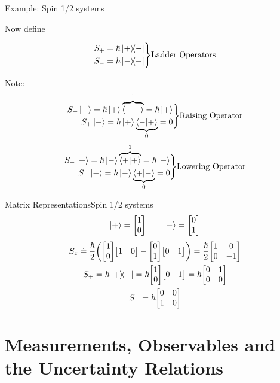\begin{frame}{Example: Spin 1/2 systems}

	Now define

	\[
		\begin{split}
			S_+ = \hbar \op{+}{-} \\
			S_- = \hbar \op{-}{+}
		\end{split}\Biggr\} \text{Ladder Operators}
	\]

	Note:
	\[
		\begin{split}
			S_+ \ket{-} = \hbar \ket + \overbrace{\ip{-}}^1 = \hbar\ket + \\
			S_+ \ket{+} = \hbar \ket + \underbrace{\ip{-}{+}}_0 =  0      \\
		\end{split} \Biggr\} \text{Raising Operator}
	\]
	\[
		\begin{split}
			S_- \ket{+} = \hbar \ket - \overbrace{\ip{+}}^1 = \hbar\ket - \\
			S_- \ket{-} = \hbar \ket - \underbrace{\ip{+}{-}}_0 =  0      \\
		\end{split} \Biggr\} \text{Lowering Operator}
	\]

\end{frame}


\begin{frame}{Matrix Representations}{Spin 1/2 systems}
	$$\ket{+} = \mqty[1 \\ 0] \qquad \ket- = \mqty[0 \\ 1]$$
	\begin{gather*}
		S_z \doteq \frac{\hbar}{2} \pqty{\mqty[1\\0] \mqty[1 & 0] - \mqty[0 \\ 1] \mqty[0 & 1]} = \frac{\hbar}{2} \mqty[\pmat{3}]\\
		S_+ = \hbar \op{+}{-} = \hbar \mqty[1 \\ 0 ] \mqty[0 & 1] = \hbar \mqty[0 & 1\\0 & 0]\\
		S_- = \hbar \mqty[0&0\\1&0]
	\end{gather*}
\end{frame}


\section{Measurements, Observables and the Uncertainty Relations}

